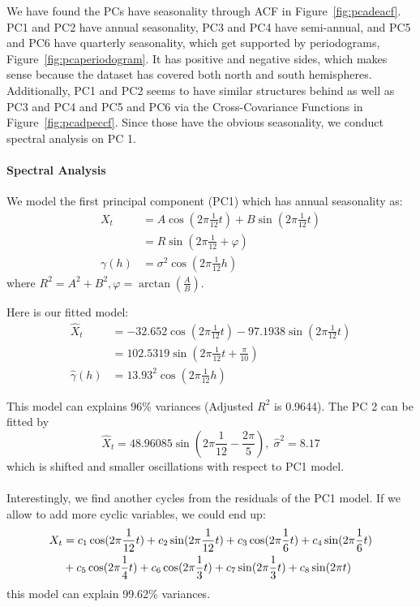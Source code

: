 \documentclass[11pt]{article}
\begin{document}
We have found the PCs have seasonality through ACF in Figure~\ref{fig:pcadeacf}. PC1 and PC2 have annual seasonality, PC3 and PC4 have semi-annual, and PC5 and PC6 have quarterly seasonality, which get supported by periodograms, Figure~\ref{fig:pcaperiodogram}. It has positive and negative sides, which makes sense because the dataset has covered both north and south hemispheres. Additionally, PC1 and PC2 seems to have similar structures behind as well as PC3 and PC4 and PC5 and PC6 via the Cross-Covariance Functions in Figure~\ref{fig:pcadpeccf}. Since those have the obvious seasonality, we conduct spectral analysis on PC 1.


\paragraph{Spectral Analysis}
We model the first principal component (PC1) which has annual seasonality as:
\begin{align}
X_t &= A\cos(2\pi\frac{1}{12}t) + B\sin(2\pi\frac{1}{12}t)  \\ 
&= R\sin(2\pi\frac{1}{12} + \varphi)\\
\gamma(h) &= \sigma^2\cos(2\pi\frac{1}{12}h) 
\end{align}
where $R^2 = A^2 + B^2, \varphi = \arctan(\frac{A}{B})$.


Here is our fitted model:
\begin{align}
\hat{X}_t & = -32.652 \cos(2\pi\frac{1}{12}t) -97.1938 \sin(2\pi\frac{1}{12}t) \\
&= 102.5319\sin(2\pi\frac{1}{12}t + \frac{\pi}{10})\\
\hat{\gamma}(h) &= 13.93^2\cos(2\pi\frac{1}{12}h) 
\end{align}

This model can explains 96\% variances (Adjusted $R^2$ is 0.9644). The PC 2 can be fitted by 
\begin{equation}
\hat{X}_t = 48.96085\sin(2\pi\frac{1}{12}-\frac{2\pi}{5} ),\; \hat{\sigma}^2 = 8.17
\end{equation}
which is shifted and smaller oscillations with respect to PC1 model. 

\paragraph{} Interestingly, we find another cycles from the residuals of the PC1 model.  If we allow to add more cyclic variables, we could end up:
\begin{align}
X_t &= c_1\cos(2\pi\frac{1}{12}t) + c_2\sin(2\pi\frac{1}{12}t) + c_3\cos(2\pi\frac{1}{6}t) + c_4\sin(2\pi\frac{1}{6}t) \notag\\
&+ c_5\cos(2\pi\frac{1}{4}t) + c_6\cos(2\pi\frac{1}{3}t) + c_7\sin(2\pi\frac{1}{3}t)  + c_8\sin(2\pi t)
\end{align}
this model can explain 99.62\% variances. 
\end{document}

